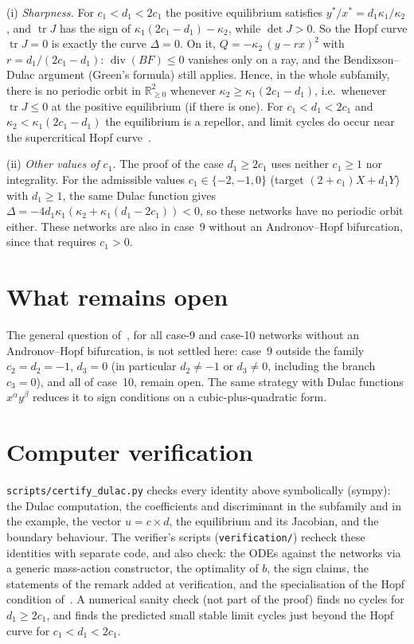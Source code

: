 \documentclass[11pt,a4paper]{report}
\begin{document}
\begin{remark}
(i) \emph{Sharpness.} For \(c_1<d_1<2c_1\) the positive equilibrium satisfies \(y^*/x^*=d_1\kappa_1/\kappa_2\), and
\(\operatorname{tr}J\) has the sign of \(\kappa_1(2c_1-d_1)-\kappa_2\), while \(\det J>0\). So the Hopf curve
\(\operatorname{tr}J=0\) is exactly the curve \(\Delta=0\). On it, \(Q=-\kappa_2\,(y-rx)^2\) with
\(r=d_1/(2c_1-d_1)\): \(\operatorname{div}(BF)\le0\) vanishes only on a ray, and the Bendixson--Dulac argument (Green's
formula) still applies. Hence, in the whole subfamily, there is no periodic orbit in \(\mathbb R^2_{\ge0}\) whenever
\(\kappa_2\ge\kappa_1(2c_1-d_1)\), i.e.\ whenever \(\operatorname{tr}J\le0\) at the positive equilibrium (if there is
one). For \(c_1<d_1<2c_1\) and \(\kappa_2<\kappa_1(2c_1-d_1)\) the equilibrium is a repellor, and limit cycles do occur
near the supercritical Hopf curve~\autocite[Theorem~9]{BBH2024}.

(ii) \emph{Other values of \(c_1\).} The proof of the case \(d_1\ge2c_1\) uses neither \(c_1\ge1\) nor integrality.
For the admissible values \(c_1\in\{-2,-1,0\}\) (target \((2+c_1)X+d_1Y\)) with \(d_1\ge1\), the same Dulac function
gives \(\Delta=-4d_1\kappa_1(\kappa_2+\kappa_1(d_1-2c_1))<0\), so these networks have no periodic orbit either. These
networks are also in case~9 without an Andronov--Hopf bifurcation, since that requires \(c_1>0\).
\end{remark}

\section{What remains open}

The general question of~\autocite{BBH2024}, for all case-9 and case-10 networks without an Andronov--Hopf
bifurcation, is not settled here: case~9 outside the family \(c_2=d_2=-1\), \(d_3=0\) (in particular \(d_2\neq-1\)
or \(d_3\neq0\), including the branch \(c_3=0\)), and all of case~10, remain open. The same strategy with Dulac
functions \(x^\alpha y^\beta\) reduces it to sign conditions on a
cubic-plus-quadratic form.

\section{Computer verification}

\texttt{scripts/certify\_dulac.py} checks every identity above symbolically (sympy): the Dulac computation, the
coefficients and discriminant in the subfamily and in the example, the vector \(u=c\times d\), the equilibrium and its
Jacobian, and the boundary behaviour. The verifier's scripts (\texttt{verification/}) recheck these
identities with separate code, and also check: the ODEs against the networks via a generic mass-action constructor,
the optimality of \(b\), the sign claims, the statements of the remark added at verification, and the specialisation of the Hopf
condition of~\autocite[Theorem~9]{BBH2024}. A numerical sanity check (not part of the proof) finds no cycles for
\(d_1\ge2c_1\), and finds the predicted small stable limit cycles just beyond the Hopf curve for \(c_1<d_1<2c_1\).

\paperreferences
\end{document}
